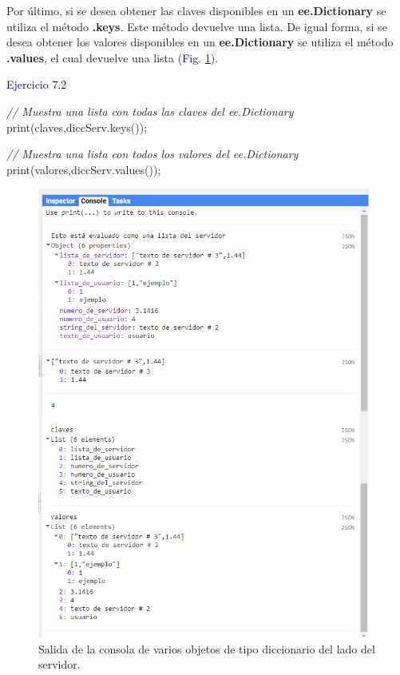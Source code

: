 \documentclass[
  12pt,
  letterpaper,
  twoside]{book}
\newenvironment{Shaded}{\begin{snugshade}}{\end{snugshade}}
\newcommand{\CommentTok}[1]{\textcolor[rgb]{0.24,0.58,0.00}{\textit{#1}}}
\newcommand{\FunctionTok}[1]{\textcolor[rgb]{0.48,0.12,0.64}{#1}}
\newcommand{\NormalTok}[1]{#1}
\newcommand{\OperatorTok}[1]{\textcolor[rgb]{0.00,0.00,0.00}{#1}}
\newcommand{\StringTok}[1]{\textcolor[rgb]{0.87,0.29,0.22}{#1}}
\newcommand\boldpurple[1]{\textcolor{darkpurple}{\textbf{#1}}}
\begin{document}
Por último, si se desea obtener las claves disponibles en un \boldpurple{ee.Dictionary} se utiliza el método \boldpurple{.keys}. Este método devuelve una lista. De igual forma, si se desea obtener los valores disponibles en un \boldpurple{ee.Dictionary} se utiliza el método \boldpurple{.values}, el cual devuelve una lista (\textcolor{darkblue}{Fig.} \ref{fig:f510}).

\textcolor{darkblue}{Ejercicio 7.2}

\begin{Shaded}
\begin{Highlighting}[]
\CommentTok{// Muestra una lista con todas las claves del ee.Dictionary}
\FunctionTok{print}\NormalTok{(}\StringTok{\textquotesingle{}claves\textquotesingle{}}\OperatorTok{,}\NormalTok{diccServ}\OperatorTok{.}\FunctionTok{keys}\NormalTok{())}\OperatorTok{;}    

\CommentTok{// Muestra una lista con todos los valores del ee.Dictionary}
\FunctionTok{print}\NormalTok{(}\StringTok{\textquotesingle{}valores\textquotesingle{}}\OperatorTok{,}\NormalTok{diccServ}\OperatorTok{.}\FunctionTok{values}\NormalTok{())}\OperatorTok{;}  
\end{Highlighting}
\end{Shaded}

\begin{figure}[H]

{\centering \includegraphics[width=0.95\linewidth]{Img/ej7} 

}

\caption{Salida de la consola de varios objetos de tipo diccionario del lado del servidor.}\label{fig:f510}
\end{figure}
\end{document}
